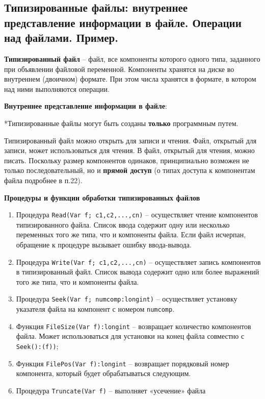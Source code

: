 



\newpage\subsection{Типизированные  файлы:  внутреннее  представление  информации  в  файле.  Операции  над 
файлами. Пример. }

\begin{myquote}
            
\end{myquote}

{\bf Типизированный файл} – файл, все компоненты которого одного типа, заданного при объявлении файловой переменной. 
Компоненты хранятся на диске во внутреннем (двоичном) формате. При этом числа хранятся в формате, в котором над ними выполняются операции. 

\noindent
{\bf{Внутреннее  представление  информации  в  файле}}:

\noindent
*Типизированные файлы могут быть созданы {\bf только} программным путем.

Типизированный файл можно открыть для записи и чтения. Файл, открытый для записи, может использоваться для чтения. В файл, открытый для чтения, можно писать.  
Поскольку размер компонентов одинаков, принципиально возможен не только последовательный, но и {\bf{прямой доступ}} (о типах доступа к компонентам файла подробнее в п.22). 

{\bf Процедуры и функции обработки типизированных файлов}

\begin{enumerate}
\item Процедура {\tt Read(Var f; c1,c2,...,cn)} – осуществляет чтение компонентов типизированного файла. Список ввода содержит одну или несколько переменных того же типа, что и компоненты файла. Если файл исчерпан, обращение к процедуре вызывает ошибку ввода-вывода.

\item Процедура {\tt Write(Var f; c1,c2,...,cn)} – осуществляет запись компонентов в типизированный файл.  Список вывода содержит одно или более выражений того же типа, что и компоненты файла.

\item Процедура {\tt Seek(Var f; numcomp:longint)} – осуществляет установку указателя файла на компонент с номером \texttt{numcomp}.

\item Функция {\tt FileSize(Var f):longint} – возвращает количество компонентов файла. Может использоваться для установки на конец файла совместно с \texttt{Seek():(f))};

\item Функция {\tt FilePos(Var f):longint} –  возвращает порядковый номер компонента, который будет обрабатываться следующим.

\item  Процедура {\tt Truncate(Var f)} – выполняет «усечение» файла
\end{enumerate}

